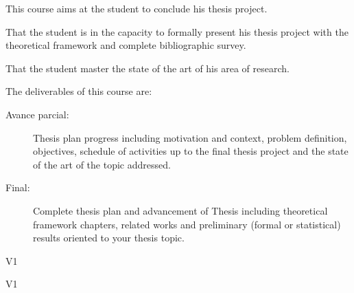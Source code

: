 \begin{syllabus}


\begin{justification}
This course aims at the student to conclude his thesis project.
\end{justification}

\begin{goals}
\item That the student is in the capacity to formally present his thesis project with the theoretical framework and complete bibliographic survey.
\item That the student master the state of the art of his area of research.
\item The deliverables of this course are:
	\begin{description}
	\item [Avance parcial:] Thesis plan progress including motivation and context, problem definition, objectives, schedule of activities up to the final thesis project and the state of the art of the topic addressed.
	\item [Final:] Complete thesis plan and advancement of Thesis including theoretical framework chapters, related works and preliminary (formal or statistical) results oriented to your thesis topic.
	\end{description}
\end{goals}

\begin{outcomes}{V1}
\item {}
\item {}
\item {}
\item {}
\item {}
\item {}
\item {}
\item {}
\end{outcomes}

\begin{competences}{V1}
\item {} 
\item {}
\item {}
\end{competences}


\end{syllabus}
